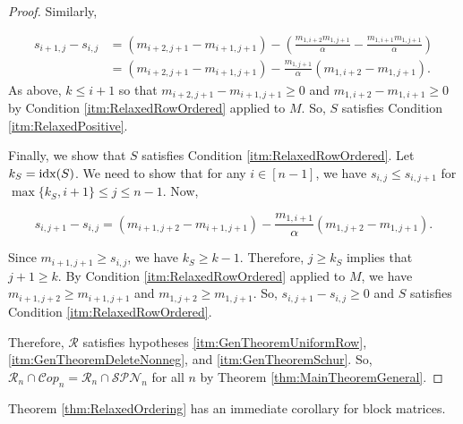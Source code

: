 \documentclass{amsart}
\def\idx{{\rm idx}}
\newcommand{\cR}{\mathcal{R}}
\newcommand{\Cop}{\mathcal{C}op}
\newcommand{\SPN}{\mathcal{SPN}}
\theoremstyle{definition}
\begin{document}
\begin{proof}
Similarly, 

\[
\begin{aligned}
s_{i+1,j} - s_{i,j} &= \left(m_{i+2,j+1} - m_{i+1,j+1}\right) - \left(\frac{m_{1,i+2}m_{1,j+1}}{\alpha} - \frac{m_{1,i+1}m_{1,j+1}}{\alpha}\right)\\
    &= \left(m_{i+2,j+1} - m_{i+1,j+1}\right) - \frac{m_{1,j+1}}{\alpha}\left(m_{1,i+2} - m_{1,j+1}\right).
\end{aligned}
\]
%
As above, $k \leq i+1$ so that $m_{i+2,j+1}-m_{i+1,j+1} \geq 0$ and $m_{1,i+2} - m_{1,i+1}\geq 0$ by Condition \ref{itm:RelaxedRowOrdered} applied to $M$. So, $S$ satisfies Condition \ref{itm:RelaxedPositive}.

Finally, we show that $S$ satisfies Condition \ref{itm:RelaxedRowOrdered}. Let $k_S = \idx(S)$. We need to show that for any $i \in [n-1]$, we have $s_{i,j}\leq s_{i,j+1}$ for $\max\{k_S,i+1\}\leq j \leq n-1$.  Now, 

\[s_{i,j+1} - s_{i,j} = \left(m_{i+1,j+2} - m_{i+1,j+1}\right) - \frac{m_{1,i+1}}{\alpha}\left(m_{1,j+2} - m_{1,j+1}\right).\]

Since $m_{i+1,j+1} \geq s_{i,j}$, we have $k_S \geq k-1$. Therefore, $j \geq k_S$ implies that $j + 1 \geq k$. By Condition \ref{itm:RelaxedRowOrdered} applied to $M$, we have $m_{i+1,j+2} \geq m_{i+1,j+1}$ and $m_{1,j+2} \geq m_{1,j+1}$. So, $s_{i,j+1} - s_{i,j} \geq 0$ and $S$ satisfies Condition \ref{itm:RelaxedRowOrdered}. 

Therefore, $\cR$ satisfies hypotheses \ref{itm:GenTheoremUniformRow}, \ref{itm:GenTheoremDeleteNonneg}, and \ref{itm:GenTheoremSchur}. So, $\cR_n \cap \Cop_n = \cR_n \cap \SPN_n$ for all $n$ by Theorem \ref{thm:MainTheoremGeneral}.
\end{proof} 

Theorem \ref{thm:RelaxedOrdering} has an immediate corollary for block matrices. 
\end{document}

